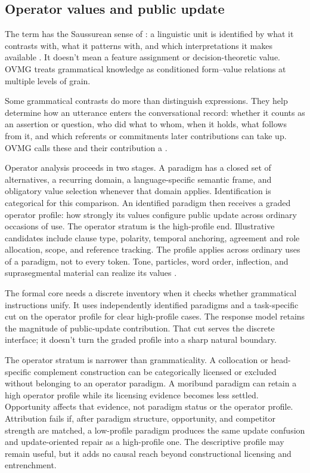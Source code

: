 \subsection{Operator values and public update}
\label{sec:operator-values}

The term  has the Saussurean sense of : a linguistic
unit is identified by what it contrasts with, what it patterns with, and which
interpretations it makes available \autocite{saussure1916}. It doesn't mean a
feature assignment or decision-theoretic value. OVMG treats grammatical
knowledge as conditioned form--value relations at multiple levels of grain.

Some grammatical contrasts do more than distinguish expressions. They help
determine how an utterance enters the conversational record: whether it counts
as an assertion or question, who did what to whom, when it holds, what follows
from it, and which referents or commitments later contributions can take up.
OVMG calls these  and their contribution a
.

Operator analysis proceeds in two stages. A paradigm has a closed set of
alternatives, a recurring domain, a language-specific semantic frame, and
obligatory value selection whenever that domain applies. Identification is
categorical for this comparison. An identified paradigm then receives a graded
operator profile: how strongly its values configure public update across
ordinary occasions of use. The operator stratum is the high-profile end.
Illustrative candidates include clause type, polarity, temporal anchoring,
agreement and role allocation, scope, and reference tracking. The profile
applies across ordinary uses of a paradigm, not to every token. Tone, particles,
word order, inflection, and suprasegmental material can realize its values
\autocite{reynolds2026operators}.

The formal core needs a discrete inventory when it checks whether grammatical
instructions unify. It uses independently identified paradigms and a
task-specific cut on the operator profile for clear high-profile cases. The
response model retains the magnitude of public-update contribution. That cut
serves the discrete interface; it doesn't turn the graded profile into a sharp
natural boundary.

The operator stratum is narrower than grammaticality. A collocation or
head-specific complement construction can be categorically licensed or excluded
without belonging to an operator paradigm. A moribund paradigm can retain a high
operator profile while its licensing evidence becomes less settled. Opportunity
affects that evidence, not paradigm status or the operator profile. Attribution
fails if, after paradigm structure, opportunity, and competitor strength are
matched, a low-profile paradigm produces the same update confusion and
update-oriented repair as a high-profile one. The descriptive profile may remain
useful, but it adds no causal reach beyond constructional licensing and
entrenchment.

